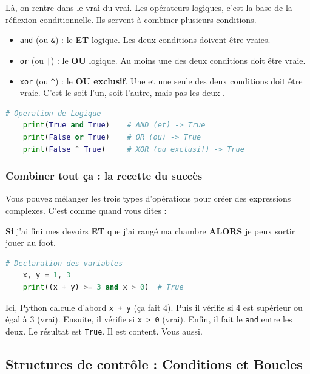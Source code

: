 \documentclass[12pt,a4paper]{article}
\begin{document}
Là, on rentre dans le vrai du vrai. Les opérateurs logiques, c'est la base de la réflexion conditionnelle. Ils servent à combiner plusieurs conditions.

\begin{itemize}
	\item [\ding{182}] \texttt{and} (ou \texttt{\&}) : le \textbf{ET} logique. Les deux conditions doivent être vraies.
	\item [\ding{183}] \texttt{or} (ou \texttt{|}) : le \textbf{OU} logique. Au moins une des deux conditions doit être vraie.
	\item [\ding{184}] \texttt{xor} (ou \texttt{\^}) : le \textbf{OU exclusif}. Une et une seule des deux conditions doit être vraie. C'est le \og soit l'un, soit l'autre, mais pas les deux \fg.
\end{itemize}

\begin{lstlisting}[language=Python]
	# Operation de Logique
	print(True and True)    # AND (et) -> True
	print(False or True)    # OR (ou) -> True
	print(False ^ True)     # XOR (ou exclusif) -> True
\end{lstlisting}

\subsubsection{Combiner tout ça : la recette du succès}

Vous pouvez mélanger les trois types d'opérations pour créer des expressions complexes. C'est comme quand vous dites :

\og \textbf{Si} j'ai fini mes devoirs \textbf{ET} que j'ai rangé ma chambre \textbf{ALORS} je peux sortir jouer au foot. \fg

\begin{lstlisting}[language=Python]
	# Declaration des variables
	x, y = 1, 3
	print((x + y) >= 3 and x > 0)  # True
\end{lstlisting}

Ici, Python calcule d'abord \texttt{x + y} (ça fait 4). Puis il vérifie si 4 est supérieur ou égal à 3 (vrai). Ensuite, il vérifie si \texttt{x > 0} (vrai). Enfin, il fait le \texttt{and} entre les deux. Le résultat est \texttt{True}. Il est content. Vous aussi.




\subsection{Structures de contrôle : Conditions et Boucles}
\end{document}
